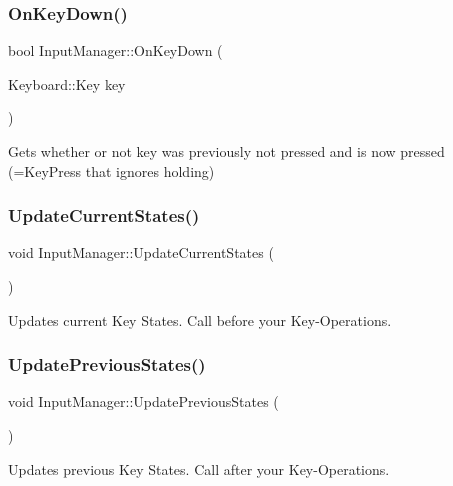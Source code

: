 \subsubsection{\texorpdfstring{On\+Key\+Down()}{OnKeyDown()}}
{\footnotesize\ttfamily bool Input\+Manager\+::\+On\+Key\+Down (\begin{DoxyParamCaption}\item[{Keyboard\+::\+Key}]{key }\end{DoxyParamCaption})}



Gets whether or not key was previously not pressed and is now pressed (=Key\+Press that ignores holding) 

\mbox{\label{class_input_manager_a93883ab3c8f5bee33e66107515acc3e8}} 
\subsubsection{\texorpdfstring{Update\+Current\+States()}{UpdateCurrentStates()}}
{\footnotesize\ttfamily void Input\+Manager\+::\+Update\+Current\+States (\begin{DoxyParamCaption}{ }\end{DoxyParamCaption})}



Updates current Key States. Call before you\textquotesingle{}r Key-\/\+Operations. 

\mbox{\label{class_input_manager_ac965e4ef52a8a7753c106f2bcae64e21}} 
\subsubsection{\texorpdfstring{Update\+Previous\+States()}{UpdatePreviousStates()}}
{\footnotesize\ttfamily void Input\+Manager\+::\+Update\+Previous\+States (\begin{DoxyParamCaption}{ }\end{DoxyParamCaption})}



Updates previous Key States. Call after you\textquotesingle{}r Key-\/\+Operations. 




